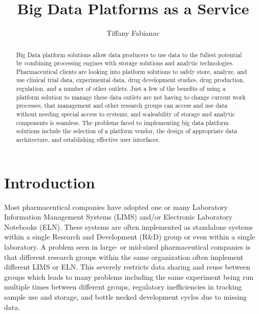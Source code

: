 \documentclass[sigconf]{acmart}
\begin{document}
\title{Big Data Platforms as a Service}


\author{Tiffany Fabianac}
\orcid{}

\renewcommand{\shortauthors}{T. Fabianac}


\begin{abstract}
Big Data platform solutions allow data producers to use data to the fullest potential by combining processing engines with storage solutions and analytic technologies. Pharmaceutical clients are looking into platform solutions to safely store, analyze, and use clinical trial data, experimental data, drug development studies, drug production, regulation, and a number of other outlets. Just a few of the benefits of using a platform solution to manage these data outlets are not having to change current work processes, that management and other research groups can access and use data without needing special access to systems, and scaleability of storage and analytic components is seamless. The problems faced to implementing big data platform solutions include the selection of a platform vendor, the design of appropriate data architecture, and establishing effective user interfaces.
\end{abstract}



\maketitle

\section{Introduction}
Most pharmaceutical companies have adopted one or many Laboratory Information Management Systems (LIMS) and/or Electronic Laboratory Notebooks (ELN). These systems are often implemented as standalone systems within a single Research and Development (R\&D) group or even within a single laboratory. A problem seen in large- or mid-sized pharmaceutical companies is that different research groups within the same organization often implement different LIMS or ELN. This severely restricts data sharing and reuse between groups which leads to many problems including the same experiment being run multiple times between different groups, regulatory inefficiencies in tracking sample use and storage, and bottle necked development cycles due to missing data. 
\end{document}
